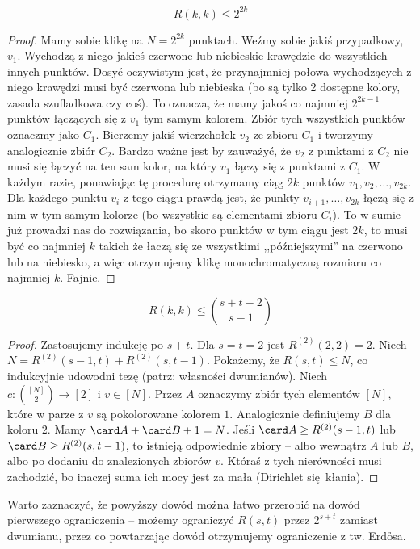 \begin{theorem}[Erd\h{o}s]
	\begin{equation}
		R(k,k) \leq 2^{2k}
	\end{equation}
\end{theorem}

\begin{proof}
	Mamy sobie klikę na $N = 2^{2k}$ punktach. Weźmy sobie jakiś przypadkowy, $v_1$. Wychodzą z niego jakieś czerwone lub niebieskie krawędzie do wszystkich innych punktów. Dosyć oczywistym jest, że przynajmniej połowa wychodzących z niego krawędzi musi być czerwona lub niebieska (bo są tylko 2 dostępne kolory, zasada szufladkowa czy coś). To oznacza, że mamy jakoś co najmniej $2^{2k-1}$ punktów łączących się z $v_1$ tym samym kolorem. Zbiór tych wszystkich punktów oznaczmy jako $C_1$. Bierzemy jakiś wierzchołek $v_2$ ze zbioru $C_1$ i tworzymy analogicznie zbiór $C_2$. Bardzo ważne jest by zauważyć, że $v_2$ z punktami z $C_2$ nie musi się łączyć na ten sam kolor, na który $v_1$ łączy się z punktami z $C_1$. W każdym razie, ponawiając tę procedurę otrzymamy ciąg $2k$ punktów $v_1, v_2, \dots, v_{2k}$. Dla każdego punktu $v_i$ z tego ciągu prawdą jest, że punkty $v_{i+1}, \dots, v_{2k}$ łączą się z nim w tym samym kolorze (bo wszystkie są elementami zbioru $C_i$). To w sumie już prowadzi nas do rozwiązania, bo skoro punktów w tym ciągu jest $2k$, to musi być co najmniej $k$ takich że łaczą się ze wszystkimi ,,późniejszymi'' na czerwono lub na niebiesko, a więc otrzymujemy klikę monochromatyczną rozmiaru co najmniej $k$. Fajnie.
\end{proof}

\begin{theorem}
	\begin{equation}
		R(k, k) \leq \binom{s+t-2}{s-1}
	\end{equation}
\end{theorem}
\begin{proof}
	Zastosujemy indukcję po $s+t$. Dla $s=t=2$ jest $R^{(2)}(2,2)=2$.
	Niech $N = R^{(2)}(s-1,t)+ R^{(2)}(s,t-1)$. Pokażemy, że $R(s,t) \le N$, co indukcyjnie udowodni tezę (patrz: własności dwumianów).
	Niech $c:\binom{[N]}{2} \to [2]$ i $v\in[N]$. Przez $A$ oznaczymy zbiór tych elementów $[N]$, które w parze z $v$ są pokolorowane kolorem $1$.
	Analogicznie definiujemy $B$ dla koloru $2$. Mamy $\card A + \card B + 1 = N$.
	Jeśli $\card A \ge R^{(2)}(s-1,t)$ lub $\card B \ge R^{(2)}(s,t-1)$,
	to istnieją odpowiednie zbiory -- albo wewnątrz $A$ lub $B$, albo po dodaniu do znalezionych zbiorów $v$.
	Któraś z tych nierówności musi zachodzić, bo inaczej suma ich mocy jest za mała (Dirichlet się kłania).
\end{proof}
Warto zaznaczyć, że powyższy dowód można łatwo przerobić na dowód pierwszego ograniczenia -- możemy ograniczyć
$R(s, t)$ przez $2^{s+t}$ zamiast dwumianu, przez co powtarzając dowód otrzymujemy ograniczenie z tw. Erd\h{o}sa.

